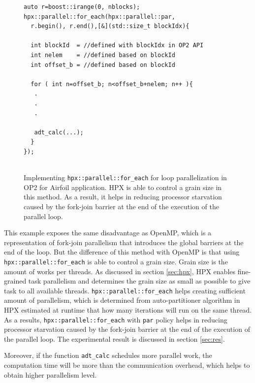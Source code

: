 \documentclass[conference]{IEEEtran}
\begin{document}
\begin{figure} [!h]
    \begin{lstlisting}    
auto r=boost::irange(0, nblocks);
hpx::parallel::for_each(hpx::parallel::par,
  r.begin(), r.end(),[&](std::size_t blockIdx){
  
  int blockId  = //defined with blockIdx in OP2 API
  int nelem    = //defined based on blockId 
  int offset_b = //defined based on blockId
        
  for ( int n=offset_b; n<offset_b+nelem; n++ ){
   .
   .
   .

   adt_calc(...);
  }
});
  
    \end{lstlisting}
    \caption{\small{Implementing \texttt{hpx::parallel::for\_each} for loop parallelization in OP2 for Airfoil application. HPX is able to control a grain size in this method. As a result, it helps in reducing processor starvation caused by the fork-join barrier at the end of the execution of the parallel loop.}}
    \label{l3}
\end{figure}



This example exposes the same disadvantage as OpenMP, which is a representation of fork-join parallelism that introduces the global barriers at the end of the loop. But the difference of this method with OpenMP is that using \texttt{hpx::parallel::for\_each} is able to control a grain size.  Grain size is the amount of works per threads. As discussed in section \ref{sec:hpx}, HPX enables fine-grained task parallelism and determines the grain size as small as possible to give task to all available threads. \texttt{hpx::parallel::for\_each} helps creating sufficient amount of parallelism, which is determined from auto-partitioner algorithm in HPX estimated at runtime that how many iterations will run on the same thread. As a results, \texttt{hpx::parallel::for\_each} with \texttt{par} policy helps in reducing processor starvation caused by the fork-join barrier at the end of the execution of the parallel loop. The experimental result is discussed in section \ref{sec:res}.

Moreover, if the function \texttt{adt\_calc} schedules more parallel work, the computation time will be more than the communication overhead, which helps to obtain higher parallelism level.



\end{document}
